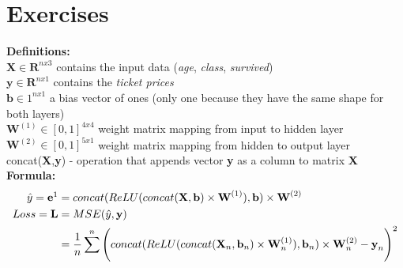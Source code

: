 \def\pathToRoot{.}


\def\issolution{}




\section*{Exercises}


\begin{exercise}

\textbf{Definitions:} \\
    $\textbf{X} \in \mathbf{R}^{nx3}$ contains the input data (\textit{age}, \textit{class}, \textit{survived})\\
    $\textbf{y} \in \mathbf{R}^{nx1}$ contains the \textit{ticket prices} \\
    $\textbf{b} \in 1^{nx1}$ a bias vector of ones (only one because they have the same shape for both layers) \\
    $\textbf{W}^{(1)} \in [0,1]^{4x4}$ weight matrix mapping from input to hidden layer \\
    $\textbf{W}^{(2)} \in [0,1]^{5x1}$ weight matrix mapping from hidden to output layer \\
    concat(\textbf{X},\textbf{y}) - operation that appends vector \textbf{y} as a column to matrix \textbf{X} \\ \linebreak
\textbf{Formula:}    
\begin{align}
\hat{y} = \textbf{e}\footnotemark & = concat( ReLU(concat(\textbf{X},\textbf{b}) \times \textbf{W}^{(1)}), \textbf{b}) \times \textbf{W}^{(2)} \\
Loss = \textbf{L} & = MSE(\hat{y}, \textbf{y}) \\
& = \frac{1}{n} \sum^n \Bigg(concat( ReLU(concat(\textbf{X}_n,\textbf{b}_n) \times \textbf{W}^{(1)}_n), \textbf{b}_n) \times \textbf{W}^{(2)}_n - \textbf{y}_n \Bigg)^2
\end{align}

\end{exercise}
